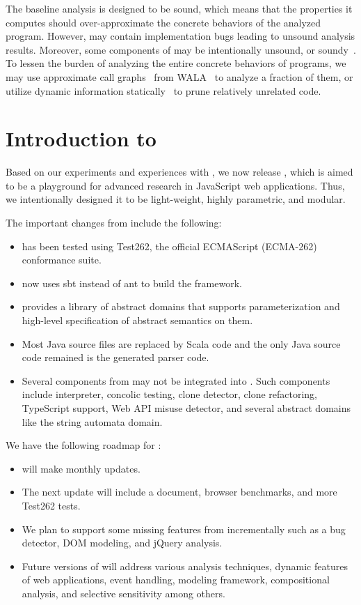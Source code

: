 The baseline analysis is designed to be sound, which means that the properties it
computes should over-approximate the concrete behaviors of the analyzed program.
However, \safe may contain implementation bugs leading to unsound analysis results.
Moreover, some components of \safe may be intentionally unsound, or soundy~\cite{soundy}.
To lessen the burden of analyzing the entire concrete behaviors of programs,
we may use approximate call graphs~\cite{icse13}
from WALA~\cite{wala} to analyze a fraction of them,
or utilize dynamic information statically~\cite{safehybrid}
to prune relatively unrelated code.

\section{Introduction to }
\label{s:2:2:safe2}
Based on our experiments and experiences with ,
we now release , which is aimed to be a playground for
advanced research in JavaScript web applications.
Thus, we intentionally designed it to be light-weight, highly parametric, and modular.

The important changes from  include the following:
\begin{itemize}
\item {} has been tested using Test262, the official ECMAScript (ECMA-262) conformance suite.
\item {} now uses sbt instead of ant to build the framework.
\item {} provides a library of abstract domains that supports
parameterization and high-level specification of abstract semantics on them.
\item Most Java source files are replaced by Scala code and the only Java source code remained is the generated parser code.
\item Several components from  may not be integrated into . Such components include interpreter, concolic testing, clone detector, clone refactoring, TypeScript support, Web API misuse detector, and several abstract domains like the string automata domain.
\end{itemize}

We have the following roadmap for :
\begin{itemize}
\item {} will make monthly updates.
\item The next update will include a \safe document, browser benchmarks, and more Test262 tests.
\item We plan to support some missing features from  incrementally such as a bug detector, DOM modeling, and jQuery analysis.
\item Future versions of  will address various analysis techniques, dynamic features of web applications, event handling, modeling framework, compositional analysis, and selective sensitivity among others.
\end{itemize}

